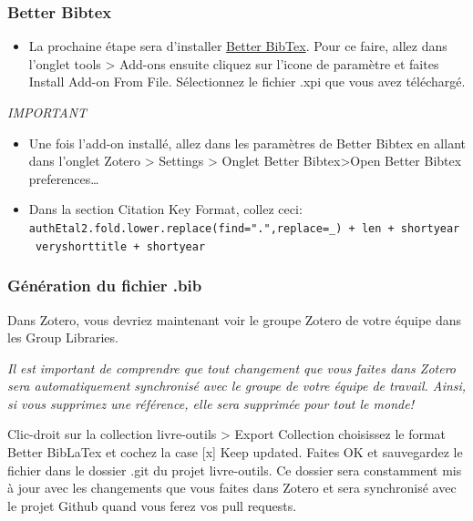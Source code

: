 \documentclass[
  letterpaper,
]{scrbook}
\providecommand{\tightlist}{%
  \setlength{\itemsep}{0pt}\setlength{\parskip}{0pt}}\usepackage{longtable,booktabs,array}
\begin{document}
\hypertarget{better-bibtex}{%
\subsubsection{Better Bibtex}\label{better-bibtex}}

\begin{itemize}
\tightlist
\item
  La prochaine étape sera d'installer
  \href{https://retorque.re/zotero-better-bibtex/installation/}{Better
  BibTex}. Pour ce faire, allez dans l'onglet tools \textgreater{}
  Add-ons ensuite cliquez sur l'icone de paramètre et faites Install
  Add-on From File. Sélectionnez le fichier .xpi que vous avez
  téléchargé.
\end{itemize}

\emph{IMPORTANT}

\begin{itemize}
\item
  Une fois l'add-on installé, allez dans les paramètres de Better Bibtex
  en allant dans l'onglet Zotero \textgreater{} Settings \textgreater{}
  Onglet Better Bibtex\textgreater Open Better Bibtex
  preferences\ldots{}
\item
  Dans la section Citation Key Format, collez ceci:
  \texttt{authEtal2.fold.lower.replace(find=".",replace=\_)\ +\ len\ +\ shortyear\ \textbar{}\ veryshorttitle\ +\ shortyear}
\end{itemize}

\hypertarget{guxe9nuxe9ration-du-fichier-.bib}{%
\subsubsection{Génération du fichier
.bib}\label{guxe9nuxe9ration-du-fichier-.bib}}

Dans Zotero, vous devriez maintenant voir le groupe Zotero de votre
équipe dans les Group Libraries.

\emph{Il est important de comprendre que tout changement que vous faites
dans Zotero sera automatiquement synchronisé avec le groupe de votre
équipe de travail. Ainsi, si vous supprimez une référence, elle sera
supprimée pour tout le monde!}

Clic-droit sur la collection livre-outils \textgreater{} Export
Collection choisissez le format Better BibLaTex et cochez la case
{[}x{]} Keep updated. Faites OK et sauvegardez le fichier dans le
dossier .git du projet livre-outils. Ce dossier sera constamment mis à
jour avec les changements que vous faites dans Zotero et sera
synchronisé avec le projet Github quand vous ferez vos pull requests.
\end{document}
